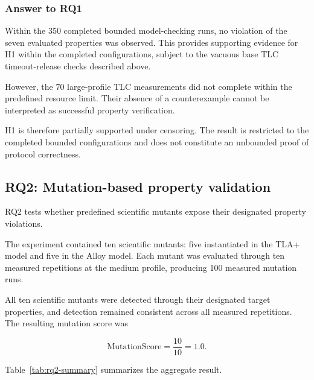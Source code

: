 \subsubsection{Answer to RQ1}
\label{subsubsec:rq1-answer}

Within the 350 completed bounded model-checking runs, no violation of
the seven evaluated properties was observed. This provides supporting
evidence for H1 within the completed configurations, subject to the
vacuous base TLC timeout-release checks described above.

However, the 70 large-profile TLC measurements did not complete within
the predefined resource limit. Their absence of a counterexample
cannot be interpreted as successful property verification.

H1 is therefore partially supported under censoring. The result is
restricted to the completed bounded configurations and does not
constitute an unbounded proof of protocol correctness.

\subsection{RQ2: Mutation-based property validation}
\label{subsec:rq2-results}

RQ2 tests whether predefined scientific mutants expose their designated
property violations.

The experiment contained ten scientific mutants: five instantiated in
the TLA+ model and five in the Alloy model. Each mutant was evaluated
through ten measured repetitions at the medium profile, producing 100
measured mutation runs.

All ten scientific mutants were detected through their designated
target properties, and detection remained consistent across all
measured repetitions. The resulting mutation score was

\begin{equation}
\mathrm{MutationScore}
=
\frac{10}{10}
=
1.0.
\label{eq:rq2-mutation-score}
\end{equation}

Table~\ref{tab:rq2-summary} summarizes the aggregate result.

